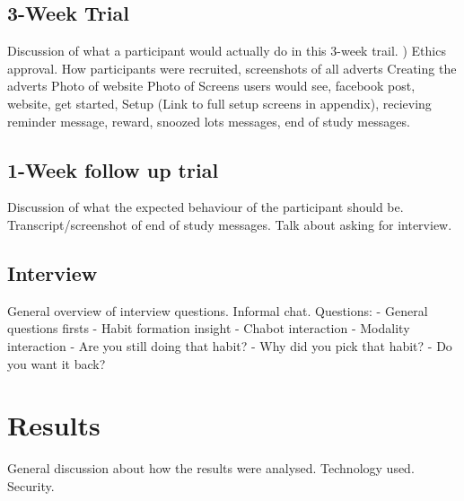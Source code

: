 \subsection{3-Week Trial}

Discussion of what a participant would actually do in this 3-week trail.\newline
)\newline
Ethics approval.\newline
How participants were recruited, screenshots of all adverts\newline
Creating the adverts\newline
Photo of website\newline
Photo of Screens users would see, facebook post, website, get started, Setup (Link to full setup screens in appendix), recieving reminder message, reward, snoozed lots messages, end of study messages.\newline

\subsection{1-Week follow up trial}

Discussion of what the expected behaviour of the participant should be.\newline
Transcript/screenshot of end of study messages.\newline
Talk about asking for interview.

\subsection{Interview}

General overview of interview questions.\newline
Informal chat.\newline
Questions:
  - General questions firsts
  - Habit formation insight
  - Chabot interaction
  - Modality interaction
  - Are you still doing that habit?
  - Why did you pick that habit?
  - Do you want it back?


\section{Results}

General discussion about how the results were analysed. Technology used. Security.

